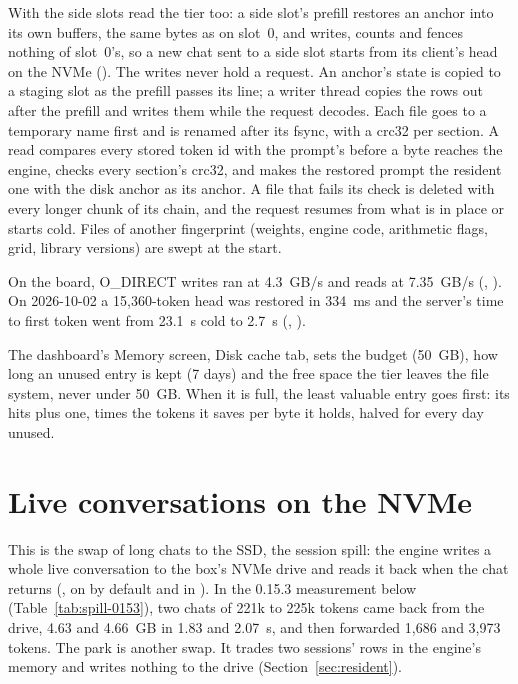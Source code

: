 With  the side slots read the tier too: a side slot's prefill restores an anchor into its own buffers, the same bytes as on slot~0, and writes, counts and fences nothing of slot~0's, so a new chat sent to a side slot starts from its client's head on the NVMe (). The writes never hold a request. An anchor's state is copied to a staging slot as the prefill passes its line; a writer thread copies the rows out after the prefill and writes them while the request decodes. Each file goes to a temporary name first and is renamed after its fsync, with a crc32 per section. A read compares every stored token id with the prompt's before a byte reaches the engine, checks every section's crc32, and makes the restored prompt the resident one with the disk anchor as its anchor. A file that fails its check is deleted with every longer chunk of its chain, and the request resumes from what is in place or starts cold. Files of another fingerprint (weights, engine code, arithmetic flags, grid, library versions) are swept at the start.

On the board, O\_DIRECT writes ran at 4.3~GB/s and reads at 7.35~GB/s (\measured, ). On 2026-10-02 a 15,360-token head was restored in 334~ms and the server's time to first token went from 23.1~s cold to 2.7~s (\measured, ).

The dashboard's Memory screen, Disk cache tab, sets the budget (50~GB), how long an unused entry is kept (7 days) and the free space the tier leaves the file system, never under 50~GB. When it is full, the least valuable entry goes first: its hits plus one, times the tokens it saves per byte it holds, halved for every day unused.

\section{Live conversations on the NVMe}\label{sec:spill}

This is the swap of long chats to the SSD, the session spill: the engine writes a whole live conversation to the box's NVMe drive and reads it back when the chat returns (, on by default and in ). In the 0.15.3 measurement below (Table~\ref{tab:spill-0153}), two chats of 221k to 225k tokens came back from the drive, 4.63 and 4.66~GB in 1.83 and 2.07~s, and then forwarded 1,686 and 3,973 tokens. The park is another swap. It trades two sessions' rows in the engine's memory and writes nothing to the drive (Section~\ref{sec:resident}).

